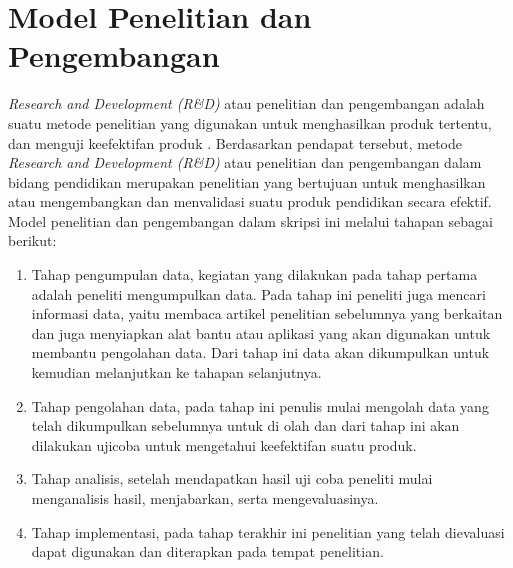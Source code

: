 \section{Model Penelitian dan Pengembangan}

\textit{Research and Development (R\&D)} atau penelitian dan pengembangan adalah suatu metode penelitian yang digunakan untuk menghasilkan produk tertentu, dan menguji keefektifan produk \cite{sugiyono2013metode}. 
Berdasarkan pendapat tersebut, metode \textit{Research and Development (R\&D)} atau penelitian dan pengembangan dalam bidang pendidikan merupakan penelitian yang bertujuan untuk menghasilkan atau mengembangkan dan menvalidasi suatu produk pendidikan secara efektif.
Model penelitian dan pengembangan dalam skripsi ini melalui tahapan sebagai berikut:

\begin{enumerate}
	\item Tahap pengumpulan data, kegiatan yang dilakukan pada tahap pertama adalah peneliti mengumpulkan data. Pada tahap ini peneliti juga mencari informasi data, yaitu membaca artikel penelitian sebelumnya yang berkaitan dan juga menyiapkan alat bantu atau aplikasi yang akan digunakan untuk membantu pengolahan data. Dari tahap ini data akan dikumpulkan untuk kemudian melanjutkan ke tahapan selanjutnya.
	\item Tahap pengolahan data, pada tahap ini penulis mulai mengolah data yang telah dikumpulkan sebelumnya untuk di olah dan dari tahap ini akan dilakukan ujicoba untuk mengetahui keefektifan suatu produk.
	\item Tahap analisis, setelah mendapatkan hasil uji coba peneliti mulai menganalisis hasil, menjabarkan, serta mengevaluasinya.
	\item Tahap implementasi, pada tahap terakhir ini penelitian yang telah dievaluasi dapat digunakan dan diterapkan pada tempat penelitian.
\end{enumerate}